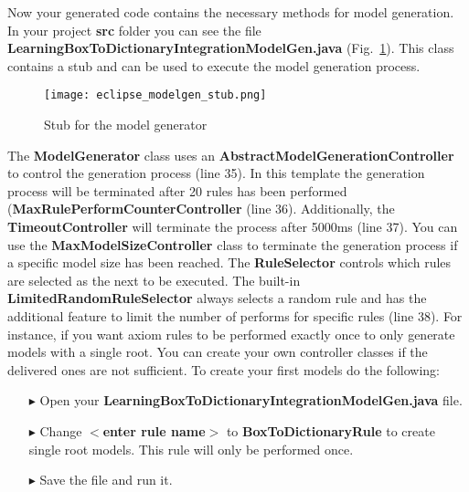  

  
  
Now your generated code contains the necessary methods for model generation.
In your project \textbf{src} folder you can see the file
\textbf{LearningBoxToDictionaryIntegrationModelGen.java}
(Fig.~\ref{eclipse:modelgen}).
This class contains a stub and can be used to execute the model generation process.
 

 
\begin{figure}[htbp]
\renewcommand\figurename{Figure}
\begin{center}
\texttt{[image: eclipse\_modelgen\_stub.png]}
\caption{Stub for the model generator}
\label{eclipse:modelgen}
\end{center}
\end{figure}

The \textbf{ModelGenerator} class uses an
\textbf{AbstractModelGenerationController} to control the generation process (line 35). In
this template the generation process will be terminated after 20 rules has been
performed (\textbf{MaxRulePerformCounterController} (line 36). 
Additionally, the \textbf{TimeoutController} will terminate the process after 5000ms (line 37). You can use the \textbf{MaxModelSizeController} class to terminate the generation process if
a specific model size has been reached. 
The \textbf{RuleSelector} controls which rules are selected as the next to be executed. 
The built-in \textbf{LimitedRandomRuleSelector} always selects a random rule and has the additional feature to limit the number of performs for specific rules (line 38).
For instance, if you want axiom rules to be performed exactly once to only generate models with a single root. 
You can create your own controller classes if the delivered ones are not sufficient. 
To create your first models do the following:


\begin{itemize}

\item[$\blacktriangleright$] Open your
\textbf{LearningBoxToDictionaryIntegrationModelGen.java} file.

\item[$\blacktriangleright$] Change \textbf{$<$enter rule name$>$} to \textbf{BoxToDictionaryRule} to
create single root models. This rule will only be performed once.

\item[$\blacktriangleright$] Save the file and run it.

\end{itemize}

